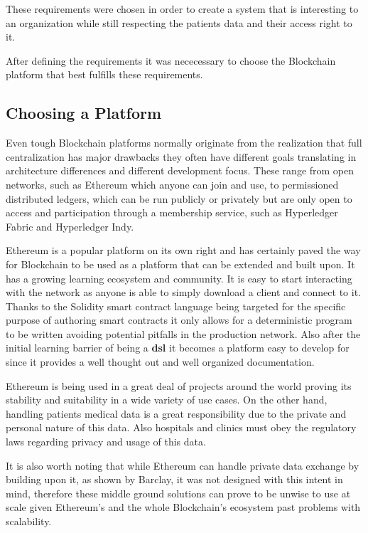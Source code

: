 These requirements were chosen in order to create a system that is interesting
to an organization while still respecting the patients data and their access
right to it. 

After defining the requirements it was nececessary to choose the Blockchain
platform that best fulfills these requirements.


\subsection{Choosing a Platform}\label{choosePlatform}

Even tough Blockchain platforms normally originate from the realization that
full centralization has major drawbacks they often have different goals
translating in architecture differences and different development focus.  These
range from open networks, such as Ethereum which anyone can join and use, to
permissioned distributed ledgers, which can be run publicly or privately but
are only open to access and participation through a membership service, such as
Hyperledger Fabric and Hyperledger Indy.

Ethereum is a popular platform on its own right and has certainly paved the way
for Blockchain to be used as a platform that can be extended and built upon. It
has a growing learning ecosystem and community. It is easy to start interacting
with the network as anyone is able to simply download a client and connect to
it.  Thanks to the Solidity smart contract language being targeted for the
specific purpose of authoring smart contracts it only allows for a
deterministic program to be written avoiding potential pitfalls in the
production network. Also after the initial learning barrier of being a
\textbf{dsl} it becomes a platform easy to develop for since it provides a well
thought out and well organized documentation. 

Ethereum is being used in a great deal of projects around the world proving its
stability and suitability in a wide variety of use cases. On the other hand,
handling patients medical data is a great responsibility due to the private and
personal nature of this data. Also hospitals and clinics must obey the
regulatory laws regarding privacy and usage of this data.

It is also worth noting that while Ethereum can handle private data exchange by
building upon it, as shown by Barclay, it was not designed with this intent in
mind, therefore these middle ground solutions can prove to be unwise to use at
scale given Ethereum's and the whole Blockchain's ecosystem past problems with
scalability.  

